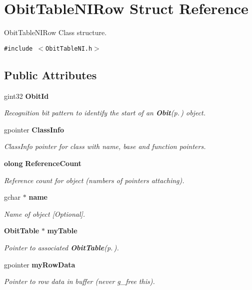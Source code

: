 \section{Obit\-Table\-NIRow Struct Reference}
\label{structObitTableNIRow}
Obit\-Table\-NIRow Class structure.  


{\tt \#include $<$Obit\-Table\-NI.h$>$}

\subsection*{Public Attributes}
\begin{CompactItemize}
\item 
gint32 {\bf Obit\-Id}
\begin{CompactList}\small\item\em Recognition bit pattern to identify the start of an {\bf Obit}{\rm (p.\,\pageref{structObit})} object. \item\end{CompactList}\item 
gpointer {\bf Class\-Info}
\begin{CompactList}\small\item\em Class\-Info pointer for class with name, base and function pointers. \item\end{CompactList}\item 
{\bf olong} {\bf Reference\-Count}
\begin{CompactList}\small\item\em Reference count for object (numbers of pointers attaching). \item\end{CompactList}\item 
gchar $\ast$ {\bf name}
\begin{CompactList}\small\item\em Name of object [Optional]. \item\end{CompactList}\item 
{\bf Obit\-Table} $\ast$ {\bf my\-Table}
\begin{CompactList}\small\item\em Pointer to associated {\bf Obit\-Table}{\rm (p.\,\pageref{structObitTable})}. \item\end{CompactList}\item 
gpointer {\bf my\-Row\-Data}
\begin{CompactList}\small\item\em Pointer to row data in buffer (never g\_\-free this). \item\end{CompactList}\item 

\end{CompactItemize}
